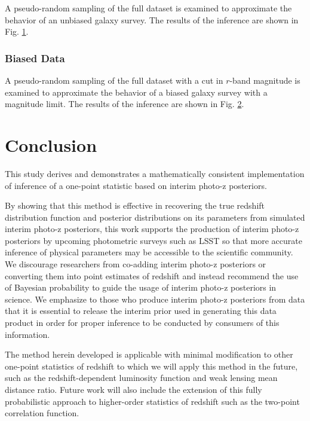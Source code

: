 \documentclass[preprint]{aastex}
\begin{document}
A pseudo-random sampling of the full dataset is examined to approximate the 
behavior of an unbiased galaxy survey.  The results of the inference are shown 
in Fig. \ref{fig:dataparam}.

\begin{figure}
\caption{}
\label{fig:dataparam}
\end{figure}

\subsubsection{Biased Data}
\label{sec:biased}

A pseudo-random sampling of the full dataset with a cut in $r$-band magnitude 
is examined to approximate the behavior of a biased galaxy survey with a 
magnitude limit.  The results of the inference are shown in Fig. 
\ref{fig:biasparam}.

\begin{figure}
\caption{}
\label{fig:biasparam}
\end{figure}

\clearpage
\section{Conclusion}
\label{sec:con}

This study derives and demonstrates a mathematically consistent implementation 
of inference of a one-point statistic based on interim photo-z posteriors.  

By showing that this method is effective in recovering the true redshift 
distribution function and posterior distributions on its parameters from 
simulated interim photo-z posteriors, this work supports the production of 
interim photo-z posteriors by upcoming photometric surveys such as LSST so that 
more accurate inference of physical parameters may be accessible to the 
scientific community.  We discourage researchers from co-adding interim photo-z 
posteriors or converting them into point estimates of redshift and instead 
recommend the use of Bayesian probability to guide the usage of interim photo-z 
posteriors in science.  We emphasize to those who produce interim photo-z 
posteriors from data that it is essential to release the interim prior used in 
generating this data product in order for proper inference to be conducted by 
consumers of this information.

The method herein developed is applicable with minimal modification to other 
one-point statistics of redshift to which we will apply this method in the 
future, such as the redshift-dependent luminosity function and weak lensing 
mean distance ratio.  Future work will also include the extension of this fully 
probabilistic approach to higher-order statistics of redshift such as the 
two-point correlation function.
\end{document}

